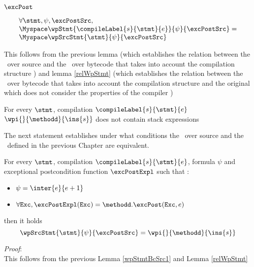 $\excPost $ 
\begin{wpStmtBcSrc1} \label{wpStmtBcSrc1}
 
$$ 
    \begin{array}{l}
    \forall \stmt, \psi, \excPostSrc , \\
       \Myspace  \wpStmt{\compileLabel{s}{\stmt}{e}}{ \psi }{ \excPostSrc }  = \\
       \Myspace   \wpSrcStmt{\stmt  }{\psi }{ \excPostSrc }  
	 
    \end{array}
 $$
\end{wpStmtBcSrc1}

This follows from the previous lemma (which establishes the relation between the \wpName \ over source and
 the \wpName \ over bytecode that takes into account the compilation structure  )
and lemma \ref{relWpStmt} (which establishes the relation between the \wpName \ over bytecode that takes into account the compilation structure  and the original \wpName which does 
not consider the properties of the compiler )

 


 
\begin{wpStmtBcSrc3}  \label{wpStmtBcSrc3}
For every $\stmt$, compilation $\compileLabel{s}{\stmt}{e}$ 
$ \wpi{}{\methodd}{\ins{s} } $ does not contain stack expressions
\end{wpStmtBcSrc3}

The next statement establishes under what conditions
 the \wpName \  over source and the \wpName \ defined in the previous Chapter are equivalent.

\begin{wpStmtBcSrc2} \label{wpStmtBcSrc2}
For every $\stmt$, compilation $\compileLabel{s}{\stmt}{e}$,  formula $\psi$ and 
   exceptional postcondition  function $\excPostExpl $ such that :
 
  \begin{itemize}
         \item $\psi = \inter{e}{e+1}$
	 \item$\forall \mbox{\rm\texttt{Exc}} ,  \excPostExpl( \mbox{\rm\texttt{Exc}} ) = \methodd.\excPost(\mbox{\rm\texttt{Exc}}, e) $ 
  \end{itemize}
      then it holds 
$$ \wpSrcStmt{\stmt}{\psi }{\excPostSrc }  = \wpi{}{\methodd}{\ins{s} }$$
\end{wpStmtBcSrc2}
\textit{Proof}: \\
This follows from the previous Lemma \ref{wpStmtBcSrc1} and Lemma \ref{relWpStmt} \\
\Qed


